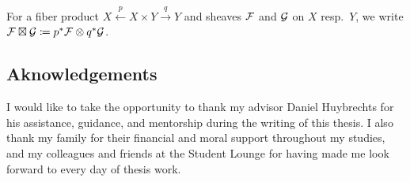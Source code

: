 For a fiber product $X \xleftarrow{p} X\times Y\xrightarrow{q} Y$ and sheaves $\mathcal{F}$ and $\mathcal{G}$ on $X$ resp.\ $Y$, we write $\mathcal{F}\boxtimes \mathcal{G}\coloneqq p^{*} \mathcal{F} \otimes q^{*} \mathcal{G}$.

\subsection{Aknowledgements}
I would like to take the opportunity to thank my advisor Daniel Huybrechts for his assistance, guidance, and mentorship during the writing of this thesis. I also thank my family for their financial and moral support throughout my studies, and my colleagues and friends at the Student Lounge for having made me look forward to every day of thesis work.